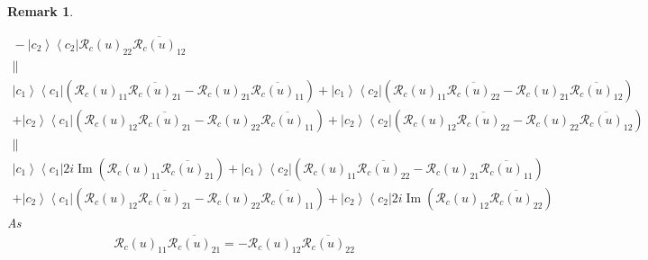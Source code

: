 \documentclass[aps,preprint]{revtex4}%
\newtheorem{remark}[theorem]{Remark}
\begin{document}
\begin{remark}
\begin{enumerate}
\begin{gather}
{}-\left\vert c_{2}\right\rangle \left\langle c_{2}\right\vert \mathcal{R}%
_{c}\left(  u\right)  _{22}\overline{\mathcal{R}_{c}\left(  u\right)  _{12}}\\
\parallel\\
\left\vert c_{1}\right\rangle \left\langle c_{1}\right\vert \left(
\mathcal{R}_{c}\left(  u\right)  _{11}\overline{\mathcal{R}_{c}\left(
u\right)  _{21}}-\mathcal{R}_{c}\left(  u\right)  _{21}\overline
{\mathcal{R}_{c}\left(  u\right)  _{11}}\right)  +\left\vert c_{1}%
\right\rangle \left\langle c_{2}\right\vert \left(  \mathcal{R}_{c}\left(
u\right)  _{11}\overline{\mathcal{R}_{c}\left(  u\right)  _{22}}%
-\mathcal{R}_{c}\left(  u\right)  _{21}\overline{\mathcal{R}_{c}\left(
u\right)  _{12}}\right)  \\
+\left\vert c_{2}\right\rangle \left\langle c_{1}\right\vert \left(
\mathcal{R}_{c}\left(  u\right)  _{12}\overline{\mathcal{R}_{c}\left(
u\right)  _{21}}-\mathcal{R}_{c}\left(  u\right)  _{22}\overline
{\mathcal{R}_{c}\left(  u\right)  _{11}}\right)  +\left\vert c_{2}%
\right\rangle \left\langle c_{2}\right\vert \left(  \mathcal{R}_{c}\left(
u\right)  _{12}\overline{\mathcal{R}_{c}\left(  u\right)  _{22}}%
-\mathcal{R}_{c}\left(  u\right)  _{22}\overline{\mathcal{R}_{c}\left(
u\right)  _{12}}\right)  \\
\parallel\\
\left\vert c_{1}\right\rangle \left\langle c_{1}\right\vert
2i\operatorname{Im}\left(  \mathcal{R}_{c}\left(  u\right)  _{11}%
\overline{\mathcal{R}_{c}\left(  u\right)  _{21}}\right)  +\left\vert
c_{1}\right\rangle \left\langle c_{2}\right\vert \left(  \mathcal{R}%
_{c}\left(  u\right)  _{11}\overline{\mathcal{R}_{c}\left(  u\right)  _{22}%
}-\mathcal{R}_{c}\left(  u\right)  _{21}\overline{\mathcal{R}_{c}\left(
u\right)  _{11}}\right)  \\
+\left\vert c_{2}\right\rangle \left\langle c_{1}\right\vert \left(
\mathcal{R}_{c}\left(  u\right)  _{12}\overline{\mathcal{R}_{c}\left(
u\right)  _{21}}-\mathcal{R}_{c}\left(  u\right)  _{22}\overline
{\mathcal{R}_{c}\left(  u\right)  _{11}}\right)  +\left\vert c_{2}%
\right\rangle \left\langle c_{2}\right\vert 2i\operatorname{Im}\left(
\mathcal{R}_{c}\left(  u\right)  _{12}\overline{\mathcal{R}_{c}\left(
u\right)  _{22}}\right)
\end{gather}
As%
\begin{gather}
\mathcal{R}_{c}\left(  u\right)  _{11}\overline{\mathcal{R}_{c}\left(
u\right)  _{21}}=-\mathcal{R}_{c}\left(  u\right)  _{12}\overline
{\mathcal{R}_{c}\left(  u\right)  _{22}}\\

\end{gather}
\end{enumerate}
\end{remark}
\end{document}
